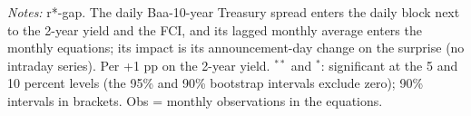 \begin{flushleft}\footnotesize\textit{Notes:} r*-gap. The daily Baa-10-year Treasury spread enters the daily block next to the 2-year yield and the FCI, and its lagged monthly average enters the monthly equations; its impact is its announcement-day change on the surprise (no intraday series). Per +1 pp on the 2-year yield. $^{**}$ and $^{*}$: significant at the 5 and 10 percent levels (the 95\% and 90\% bootstrap intervals exclude zero); 90\% intervals in brackets. Obs = monthly observations in the equations.\end{flushleft}
\endgroup
